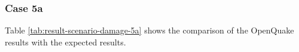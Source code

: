 \subsubsection{Case 5a}




Table \ref{tab:result-scenario-damage-5a} shows the comparison of the OpenQuake results with the expected results.

